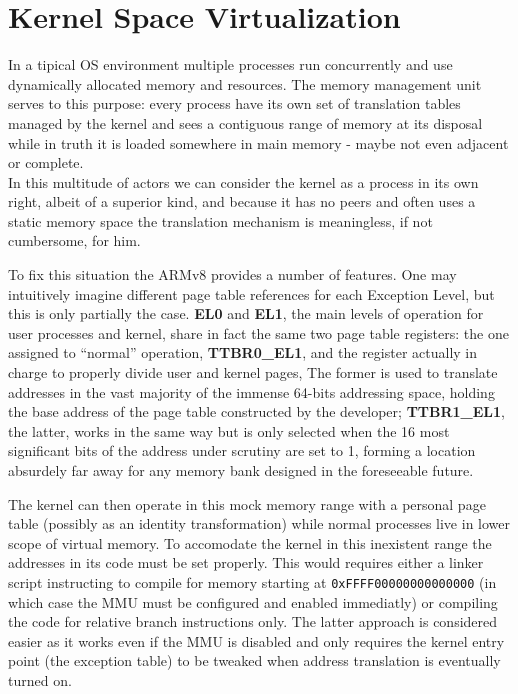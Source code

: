 \documentclass[12pt,a4paper,openright,twoside]{report}
\begin{document}
\section{Kernel Space Virtualization}
\label{kernelvirt}
In a tipical OS environment multiple processes run concurrently and use dynamically
allocated memory and resources. The memory management unit serves to this purpose:
every process have its own set of translation tables managed by the kernel and sees a 
contiguous range of memory at its disposal while in truth it is loaded somewhere
in main memory - maybe not even adjacent or complete.\\
 In this multitude of actors we can
consider the kernel as a process in its own right, albeit of a superior kind,
and because it has no peers and often uses a static memory space the 
translation mechanism is meaningless, if not cumbersome, for him.

To fix this situation the ARMv8 provides a number of features. One may intuitively
imagine different page table references for each Exception Level, but this is 
only partially the case. \textbf{EL0} and \textbf{EL1}, the main levels of operation
for user processes and kernel, share in fact the same two page table registers:
the one assigned to ``normal'' operation, \textbf{TTBR0\_EL1}, and the register
 actually in charge to properly divide user and kernel pages,
 The former is used to translate addresses in the vast majority of the
 immense 64-bits addressing space, holding the base address of the page table
 constructed by the developer; \textbf{TTBR1\_EL1}, the latter, works in the
 same way but is only selected when the 16 most significant bits of the address
 under scrutiny are set to 1, forming a location absurdely far away for any memory 
 bank designed in the foreseeable future.

 The kernel can then operate in this mock memory range with a personal page
 table (possibly as an identity transformation) while normal processes live in 
 lower scope of virtual memory. To accomodate the kernel in this inexistent
 range the addresses in its code must be set properly. This would requires either
 a linker script instructing to compile for memory starting at 
 {\tt 0xFFFF00000000000000} (in which case the MMU must be configured and 
 enabled immediatly) or compiling the code for relative branch instructions only.
 The latter approach is considered easier as it works even if the MMU is disabled
 and only requires the kernel entry point (the exception table) to be tweaked 
 when address translation is eventually turned on.\\
\end{document}
